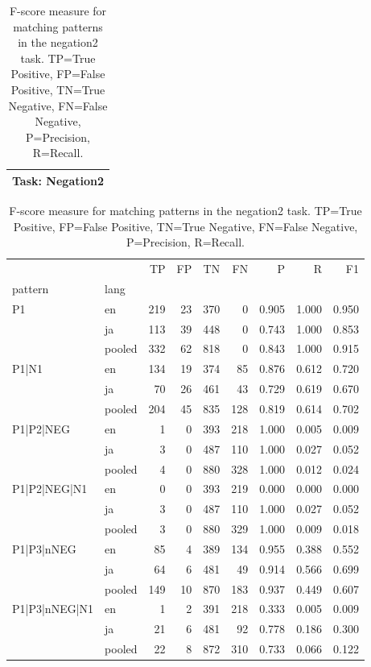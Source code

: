 
\begin{table}[h!]
\centering
\begin{tabular}{p{}}
\toprule
\textbf{Task: Negation2} \\
\midrule
\end{tabular}
\vspace{10pt}
\begin{tabular}{llrrrrrrr}
\toprule
 &  & TP & FP & TN & FN & P & R & F1 \\
pattern & lang &  &  &  &  &  &  &  \\
\midrule
\multirow[t]{3}{*}{P1} & en & 219 & 23 & 370 & 0 & 0.905 & 1.000 & 0.950 \\
 & ja & 113 & 39 & 448 & 0 & 0.743 & 1.000 & 0.853 \\
 & pooled & 332 & 62 & 818 & 0 & 0.843 & 1.000 & 0.915 \\
\cline{1-9}
\multirow[t]{3}{*}{P1|N1} & en & 134 & 19 & 374 & 85 & 0.876 & 0.612 & 0.720 \\
 & ja & 70 & 26 & 461 & 43 & 0.729 & 0.619 & 0.670 \\
 & pooled & 204 & 45 & 835 & 128 & 0.819 & 0.614 & 0.702 \\
\cline{1-9}
\multirow[t]{3}{*}{P1|P2|NEG} & en & 1 & 0 & 393 & 218 & 1.000 & 0.005 & 0.009 \\
 & ja & 3 & 0 & 487 & 110 & 1.000 & 0.027 & 0.052 \\
 & pooled & 4 & 0 & 880 & 328 & 1.000 & 0.012 & 0.024 \\
\cline{1-9}
\multirow[t]{3}{*}{P1|P2|NEG|N1} & en & 0 & 0 & 393 & 219 & 0.000 & 0.000 & 0.000 \\
 & ja & 3 & 0 & 487 & 110 & 1.000 & 0.027 & 0.052 \\
 & pooled & 3 & 0 & 880 & 329 & 1.000 & 0.009 & 0.018 \\
\cline{1-9}
\multirow[t]{3}{*}{P1|P3|nNEG} & en & 85 & 4 & 389 & 134 & 0.955 & 0.388 & 0.552 \\
 & ja & 64 & 6 & 481 & 49 & 0.914 & 0.566 & 0.699 \\
 & pooled & 149 & 10 & 870 & 183 & 0.937 & 0.449 & 0.607 \\
\cline{1-9}
\multirow[t]{3}{*}{P1|P3|nNEG|N1} & en & 1 & 2 & 391 & 218 & 0.333 & 0.005 & 0.009 \\
 & ja & 21 & 6 & 481 & 92 & 0.778 & 0.186 & 0.300 \\
 & pooled & 22 & 8 & 872 & 310 & 0.733 & 0.066 & 0.122 \\
\cline{1-9}
\bottomrule
\end{tabular}
\caption{F-score measure for matching patterns in the negation2 task. TP=True Positive, FP=False Positive, TN=True Negative, FN=False Negative, P=Precision, R=Recall.}
\label{tab:negation2_f1}
\end{table}
